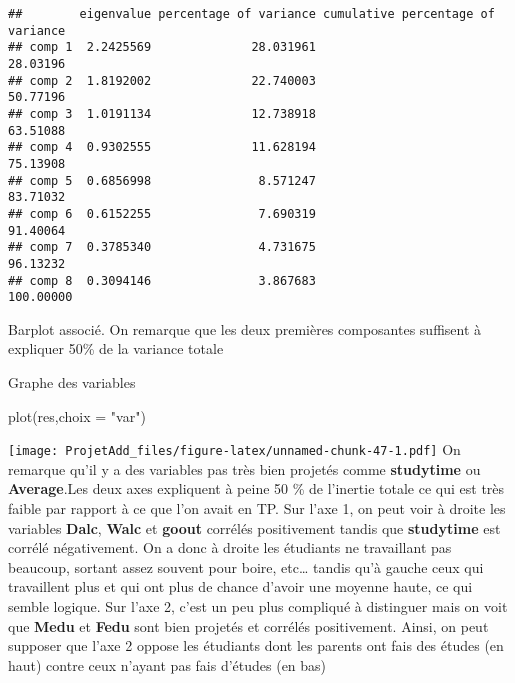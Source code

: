 \documentclass[
]{article}
\newenvironment{Shaded}{\begin{snugshade}}{\end{snugshade}}
\newcommand{\AttributeTok}[1]{\textcolor[rgb]{0.77,0.63,0.00}{#1}}
\newcommand{\CommentTok}[1]{\textcolor[rgb]{0.56,0.35,0.01}{\textit{#1}}}
\newcommand{\FunctionTok}[1]{\textcolor[rgb]{0.00,0.00,0.00}{#1}}
\newcommand{\NormalTok}[1]{#1}
\newcommand{\StringTok}[1]{\textcolor[rgb]{0.31,0.60,0.02}{#1}}
\begin{document}
\begin{verbatim}
##        eigenvalue percentage of variance cumulative percentage of variance
## comp 1  2.2425569              28.031961                          28.03196
## comp 2  1.8192002              22.740003                          50.77196
## comp 3  1.0191134              12.738918                          63.51088
## comp 4  0.9302555              11.628194                          75.13908
## comp 5  0.6856998               8.571247                          83.71032
## comp 6  0.6152255               7.690319                          91.40064
## comp 7  0.3785340               4.731675                          96.13232
## comp 8  0.3094146               3.867683                         100.00000
\end{verbatim}

Barplot associé. On remarque que les deux premières composantes
suffisent à expliquer 50\% de la variance totale

\begin{Shaded}
\end{Shaded}

Graphe des variables

\begin{Shaded}
\begin{Highlighting}[]
\FunctionTok{plot}\NormalTok{(res,}\AttributeTok{choix =} \StringTok{"var"}\NormalTok{)}
\end{Highlighting}
\end{Shaded}

\texttt{[image: ProjetAdd\_files/figure-latex/unnamed-chunk-47-1.pdf]} On
remarque qu'il y a des variables pas très bien projetés comme
\textbf{studytime} ou \textbf{Average}.Les deux axes expliquent à peine
50 \% de l'inertie totale ce qui est très faible par rapport à ce que
l'on avait en TP. Sur l'axe 1, on peut voir à droite les variables
\textbf{Dalc}, \textbf{Walc} et \textbf{goout} corrélés positivement
tandis que \textbf{studytime} est corrélé négativement. On a donc à
droite les étudiants ne travaillant pas beaucoup, sortant assez souvent
pour boire, etc\ldots{} tandis qu'à gauche ceux qui travaillent plus et
qui ont plus de chance d'avoir une moyenne haute, ce qui semble logique.
Sur l'axe 2, c'est un peu plus compliqué à distinguer mais on voit que
\textbf{Medu} et \textbf{Fedu} sont bien projetés et corrélés
positivement. Ainsi, on peut supposer que l'axe 2 oppose les étudiants
dont les parents ont fais des études (en haut) contre ceux n'ayant pas
fais d'études (en bas)
\end{document}
